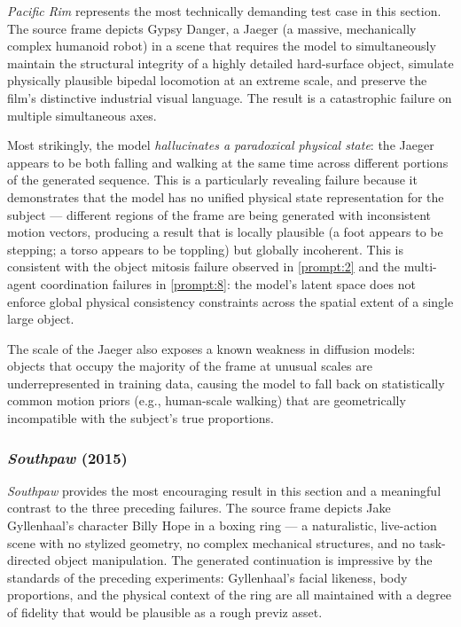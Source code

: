 \documentclass[sigconf]{acmart}
\begin{document}
\noindent \textit{Pacific Rim} represents the most technically
demanding test case in this section. The source frame depicts Gypsy Danger, a
Jaeger (a massive, mechanically complex humanoid robot) in a
scene that requires the model to simultaneously maintain the
structural integrity of a highly detailed hard-surface object,
simulate physically plausible bipedal locomotion at an extreme scale,
and preserve the film's distinctive industrial visual language.
The result is a catastrophic failure on multiple simultaneous axes.

Most strikingly, the model \textit{hallucinates a paradoxical
    physical state}: the Jaeger appears to be both falling and walking
at the same time across different portions of the generated
sequence. This is a particularly revealing failure because it
demonstrates that the model has no unified physical state
representation for the subject — different regions of the frame
are being generated with inconsistent motion vectors, producing
a result that is locally plausible (a foot appears to be
stepping; a torso appears to be toppling) but globally
incoherent. This is consistent with the object mitosis failure
observed in \ref{prompt:2} and the multi-agent coordination
failures in \ref{prompt:8}: the model's latent space does
not enforce global physical consistency constraints across the
spatial extent of a single large object.

The scale of the Jaeger also exposes a known weakness in diffusion
models: objects that occupy the majority of the frame at unusual
scales are underrepresented in training data, causing the model to
fall back on statistically common motion priors (e.g., human-scale
walking) that are geometrically incompatible with the subject's
true proportions.

\subsubsection*{\textit{Southpaw} (2015)}


\noindent \textit{Southpaw} provides the most encouraging result in
this section and a meaningful contrast to the three preceding
failures. The source frame depicts Jake Gyllenhaal's character
Billy Hope in a boxing ring — a naturalistic, live-action scene
with no stylized geometry, no complex mechanical structures, and
no task-directed object manipulation. The generated continuation
is impressive by the standards of the preceding experiments:
Gyllenhaal's facial likeness, body proportions, and the physical
context of the ring are all maintained with a degree of fidelity
that would be plausible as a rough previz asset.
\end{document}
